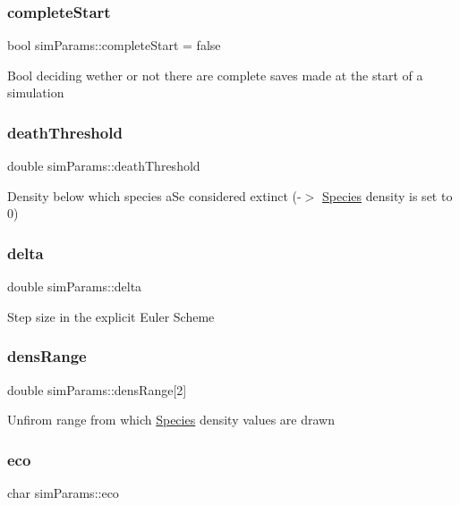 \subsubsection{\texorpdfstring{complete\+Start}{completeStart}}
{\footnotesize\ttfamily bool sim\+Params\+::complete\+Start = false}

Bool deciding wether or not there are complete saves made at the start of a simulation \hypertarget{structsimParams_aec04ef00f25e3bb5585a7a4b50c32b9a}{}\label{structsimParams_aec04ef00f25e3bb5585a7a4b50c32b9a} 
\subsubsection{\texorpdfstring{death\+Threshold}{deathThreshold}}
{\footnotesize\ttfamily double sim\+Params\+::death\+Threshold}

Density below which species a\+Se considered extinct (-\/$>$ \hyperlink{classSpecies}{Species} density is set to 0) \hypertarget{structsimParams_a1d2d1053c8780cea2eb1f703b1bcafd0}{}\label{structsimParams_a1d2d1053c8780cea2eb1f703b1bcafd0} 
\subsubsection{\texorpdfstring{delta}{delta}}
{\footnotesize\ttfamily double sim\+Params\+::delta}

Step size in the explicit Euler Scheme \hypertarget{structsimParams_a48b3258fb2eabaf36a4392a3be846366}{}\label{structsimParams_a48b3258fb2eabaf36a4392a3be846366} 
\subsubsection{\texorpdfstring{dens\+Range}{densRange}}
{\footnotesize\ttfamily double sim\+Params\+::dens\+Range\mbox{[}2\mbox{]}}

Unfirom range from which \hyperlink{classSpecies}{Species} density values are drawn \hypertarget{structsimParams_ac1a96378c33a770e34ffba03498735c9}{}\label{structsimParams_ac1a96378c33a770e34ffba03498735c9} 
\subsubsection{\texorpdfstring{eco}{eco}}
{\footnotesize\ttfamily char sim\+Params\+::eco}

